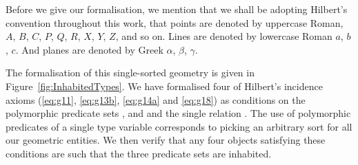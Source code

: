 Before we give our formalisation, we mention that we shall be adopting Hilbert's convention throughout this work, that points are denoted by uppercase Roman, $A$, $B$, $C$, $P$, $Q$, $R$, $X$, $Y$, $Z$, and so on. Lines are denoted by lowercase Roman $a$, $b$, $c$. And planes are denoted by Greek $\alpha$, $\beta$, $\gamma$.

The formalisation of this single-sorted geometry is given in Figure~\ref{fig:InhabitedTypes}. We have formalised four of Hilbert's incidence axioms (\ref{eq:g11}, \ref{eq:g13b}, \ref{eq:g14a} and \ref{eq:g18}) as conditions on the polymorphic predicate sets ,  and  and the single relation . The use of polymorphic predicates of a single type variable corresponds to picking an arbitrary sort for all our geometric entities. We then verify that any four objects satisfying these conditions are such that the three predicate sets are inhabited.

